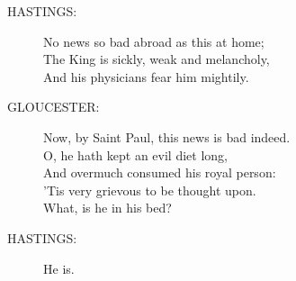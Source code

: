 \documentclass{article}
\begin{document}
\begin{description}
\item[HASTINGS:] 
\hspace{1pt}No news so bad abroad as this at home;\\
\hspace{1pt}The King is sickly, weak and melancholy,\\
\hspace{1pt}And his physicians fear him mightily.\\
\end{description}
\begin{description}
\item[GLOUCESTER:] 
\hspace{1pt}Now, by Saint Paul, this news is bad indeed.\\
\hspace{1pt}O, he hath kept an evil diet long,\\
\hspace{1pt}And overmuch consumed his royal person:\\
\hspace{1pt}'Tis very grievous to be thought upon.\\
\hspace{1pt}What, is he in his bed?\\
\end{description}
\begin{description}
\item[HASTINGS:] 
\hspace{1pt}He is.\\
\end{description}
\end{document}
